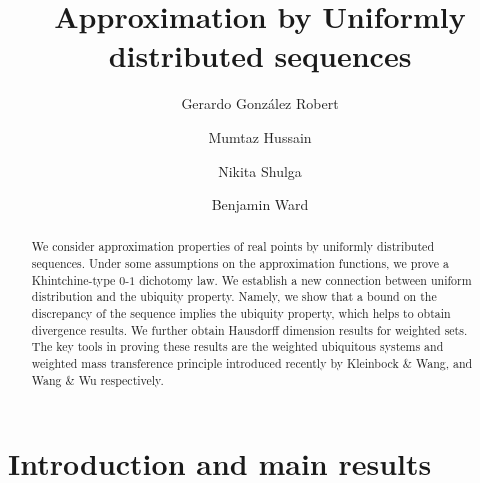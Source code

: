 \documentclass{amsart}
\theoremstyle{definition}
\newcommand{\0}{\mbf 0}%
\begin{document}

\title{Approximation by Uniformly distributed sequences}

\author[G. Gonz\'alez Robert]{Gerardo Gonz\'alez Robert}
\address{G. Gonz\'alez Robert,  Department of Mathematical and Physical Sciences,  La Trobe University, Bendigo 3552, Australia. }


\author[M. Hussain]{Mumtaz Hussain}
\address{Mumtaz Hussain,  Department of Mathematical and Physical Sciences,  La Trobe University, Bendigo 3552, Australia. }



\author[N. Shulga]{Nikita Shulga}
\address{Nikita Shulga,  Department of Mathematical and Physical Sciences,  La Trobe University, Bendigo 3552, Australia. }

\author[B. Ward]{ Benjamin Ward}
\address{Benjamin Ward,  {Department of Mathematics, University of York, Heslington, YO10 5DD.} }


\frenchspacing
\maketitle
\begin{abstract}
We consider approximation properties of real points by uniformly distributed sequences. Under some assumptions on the approximation functions, we prove a Khintchine-type $0$-$1$ dichotomy law. We establish a new connection between uniform distribution and the ubiquity property. Namely, we show that a bound on the discrepancy of the sequence implies the ubiquity property, which helps to obtain divergence results. We further obtain Hausdorff dimension results for weighted sets. The key tools in proving these results are the weighted ubiquitous systems and weighted mass transference principle introduced recently by Kleinbock \& Wang, and  Wang \& Wu respectively.

\end{abstract}



\section{Introduction and main results}
\end{document}
